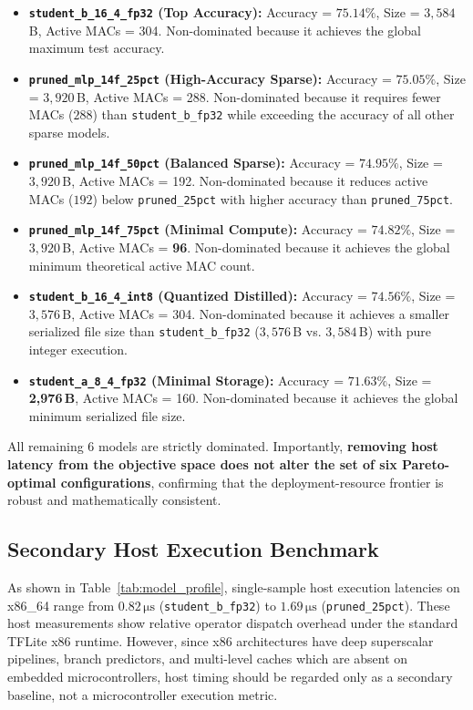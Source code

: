 \documentclass[journal,10pt]{IEEEtran}
\begin{document}
\begin{itemize}
    \item \textbf{\texttt{student\_b\_16\_4\_fp32} (Top Accuracy):} Accuracy = $75.14\%$, Size = $3,584$\,B, Active MACs = 304. Non-dominated because it achieves the global maximum test accuracy.
    \item \textbf{\texttt{pruned\_mlp\_14f\_25pct} (High-Accuracy Sparse):} Accuracy = $75.05\%$, Size = $3,920$\,B, Active MACs = 288. Non-dominated because it requires fewer MACs ($288$) than \texttt{student\_b\_fp32} while exceeding the accuracy of all other sparse models.
    \item \textbf{\texttt{pruned\_mlp\_14f\_50pct} (Balanced Sparse):} Accuracy = $74.95\%$, Size = $3,920$\,B, Active MACs = 192. Non-dominated because it reduces active MACs ($192$) below \texttt{pruned\_25pct} with higher accuracy than \texttt{pruned\_75pct}.
    \item \textbf{\texttt{pruned\_mlp\_14f\_75pct} (Minimal Compute):} Accuracy = $74.82\%$, Size = $3,920$\,B, Active MACs = \textbf{96}. Non-dominated because it achieves the global minimum theoretical active MAC count.
    \item \textbf{\texttt{student\_b\_16\_4\_int8} (Quantized Distilled):} Accuracy = $74.56\%$, Size = $3,576$\,B, Active MACs = 304. Non-dominated because it achieves a smaller serialized file size than \texttt{student\_b\_fp32} ($3,576$\,B vs. $3,584$\,B) with pure integer execution.
    \item \textbf{\texttt{student\_a\_8\_4\_fp32} (Minimal Storage):} Accuracy = $71.63\%$, Size = \textbf{2,976\,B}, Active MACs = 160. Non-dominated because it achieves the global minimum serialized file size.
\end{itemize}

All remaining 6 models are strictly dominated. Importantly, \textbf{removing host latency from the objective space does not alter the set of six Pareto-optimal configurations}, confirming that the deployment-resource frontier is robust and mathematically consistent.

\subsection{Secondary Host Execution Benchmark}
As shown in Table~\ref{tab:model_profile}, single-sample host execution latencies on x86\_64 range from $0.82\,\si{\micro\second}$ (\texttt{student\_b\_fp32}) to $1.69\,\si{\micro\second}$ (\texttt{pruned\_25pct}). These host measurements show relative operator dispatch overhead under the standard TFLite x86 runtime. However, since x86 architectures have deep superscalar pipelines, branch predictors, and multi-level caches which are absent on embedded microcontrollers, host timing should be regarded only as a secondary baseline, not a microcontroller execution metric.
\end{document}

